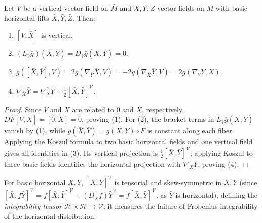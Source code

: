 \begin{proposition}
  \label{prop:pet-ch4-submersion-basic-properties}

  Let $V$ be a vertical vector field on $\bar M$ and $X,Y,Z$ vector fields on
  $M$ with basic horizontal lifts $\bar X,\bar Y,\bar Z$. Then:
  \begin{enumerate}
  \item $[V,\bar X]$ is vertical.
  \item $(L_V\bar g)(\bar X,\bar Y)=D_V\bar g(\bar X,\bar Y)=0$.
  \item $\bar g([\bar X,\bar Y],V)=2\bar g(\nabla_{\bar Y}\bar X,V)=-2\bar g(\nabla_{\bar X}\bar Y,V)=2\bar g(\nabla_VY,X)$.
  \item $\nabla_{\bar X}\bar Y=\overline{\nabla_XY}+\tfrac12[\bar X,\bar Y]^{\mathcal V}$.
  \end{enumerate}
\end{proposition}
\begin{proof}
  \sketch
  Since $V$ and $\bar X$ are related to $0$ and $X$, respectively,
  $DF[V,\bar X]=[0,X]=0$, proving (1). For (2), the bracket terms in
  $L_V\bar g(\bar X,\bar Y)$ vanish by (1), while
  $\bar g(\bar X,\bar Y)=g(X,Y)\circ F$ is constant along each fiber. Applying
  the Koszul formula to two basic horizontal fields and one vertical field
  gives all identities in (3). Its vertical projection is
  $\tfrac12[\bar X,\bar Y]^{\mathcal V}$; applying Koszul to three basic fields
  identifies the horizontal projection with $\overline{\nabla_XY}$, proving
  (4).
\end{proof}


\begin{definition}
  \label{def:pet-ch4-integrability-tensor}

  For basic horizontal $\bar X,\bar Y$, $[\bar X,\bar Y]^{\mathcal V}$ is
  tensorial and skew-symmetric in $\bar X,\bar Y$ (since
  $[\bar X,f\bar Y]^{\mathcal V}=f[\bar X,\bar Y]^{\mathcal V}+(D_{\bar X}f)\bar Y^{\mathcal V}=f[\bar X,\bar Y]^{\mathcal V}$,
  as $\bar Y$ is horizontal), defining the \emph{integrability tensor}
  $\mathcal H\times\mathcal H\to\mathcal V$; it measures the failure of
  Frobenius integrability of the horizontal distribution.
\end{definition}

